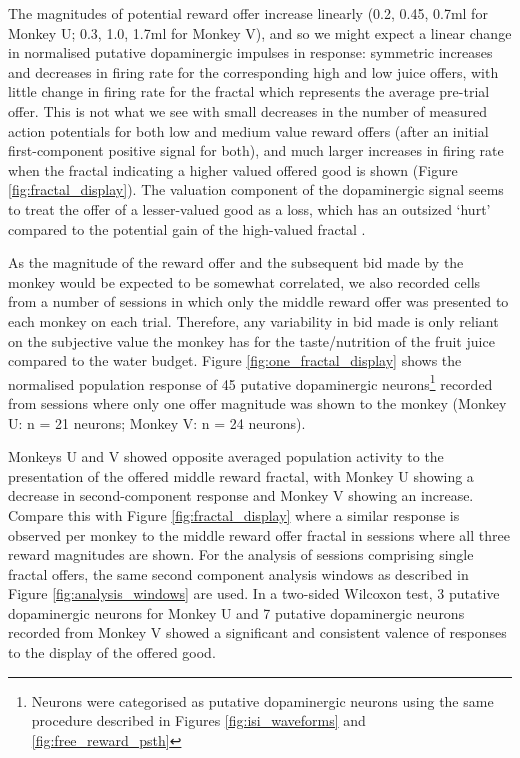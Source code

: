 The magnitudes of potential reward offer increase linearly (0.2, 0.45, 0.7ml for Monkey U; 0.3, 1.0, 1.7ml for Monkey V), and so we might expect a linear change in normalised putative dopaminergic impulses in response: symmetric increases and decreases in firing rate for the corresponding high and low juice offers, with little change in firing rate for the fractal which represents the average pre-trial offer. This is not what we see with small decreases in the number of measured action potentials for both low and medium value reward offers (after an initial first-component positive signal for both), and much larger increases in firing rate when the fractal indicating a higher valued offered good is shown (Figure \ref{fig:fractal_display}). The valuation component of the dopaminergic signal seems to treat the offer of a lesser-valued good as a loss, which has an outsized ‘hurt' compared to the potential gain of the high-valued fractal \cite{kahnemanProspectTheoryAnalysis1979}.

As the magnitude of the reward offer and the subsequent bid made by the monkey would be expected to be somewhat correlated, we also recorded cells from a number of sessions in which only the middle reward offer was presented to each monkey on each trial. Therefore, any variability in bid made is only reliant on the subjective value the monkey has for the taste/nutrition of the fruit juice compared to the water budget. Figure \ref{fig:one_fractal_display} shows the normalised population response of 45 putative dopaminergic neurons\footnote{Neurons were categorised as putative dopaminergic neurons using the same procedure described in Figures \ref{fig:isi_waveforms} and \ref{fig:free_reward_psth}} recorded from sessions where only one offer magnitude was shown to the monkey (Monkey U: n = 21 neurons; Monkey V: n = 24 neurons). 

Monkeys U and V showed opposite averaged population activity to the presentation of the offered middle reward fractal, with Monkey U showing a decrease in second-component response and Monkey V showing an increase. Compare this with Figure \ref{fig:fractal_display} where a similar response is observed per monkey to the middle reward offer fractal in sessions where all three reward magnitudes are shown. For the analysis of sessions comprising single fractal offers, the same second component analysis windows as described in Figure \ref{fig:analysis_windows} are used. In a two-sided Wilcoxon test, 3 putative dopaminergic neurons for Monkey U and 7 putative dopaminergic neurons recorded from Monkey V showed a significant and consistent valence of responses to the display of the offered good.

